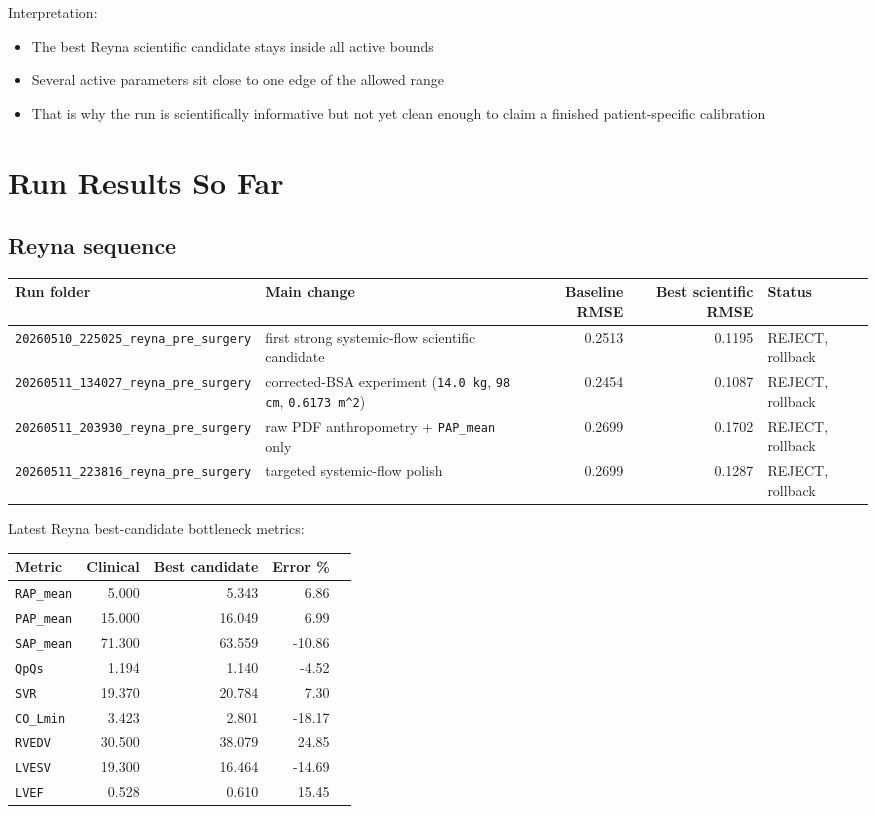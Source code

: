 \documentclass[11pt,a4paper]{article}
\begin{document}
Interpretation:

\begin{itemize}[leftmargin=1.5em]
    \item The best Reyna scientific candidate stays inside all active bounds
    \item Several active parameters sit close to one edge of the allowed range
    \item That is why the run is scientifically informative but not yet clean
    enough to claim a finished patient-specific calibration
\end{itemize}

\section{Run Results So Far}

\subsection{Reyna sequence}

\begin{longtable}{p{4.0cm}p{4.7cm}rrp{3.1cm}}
\toprule
Run folder & Main change & Baseline RMSE & Best scientific RMSE & Status \\
\midrule
\endhead
\texttt{20260510\_225025\_reyna\_pre\_surgery} & first strong systemic-flow scientific candidate & 0.2513 & 0.1195 & REJECT, rollback \\
\texttt{20260511\_134027\_reyna\_pre\_surgery} & corrected-BSA experiment (\texttt{14.0 kg}, \texttt{98 cm}, \texttt{0.6173 m\^{}2}) & 0.2454 & 0.1087 & REJECT, rollback \\
\texttt{20260511\_203930\_reyna\_pre\_surgery} & raw PDF anthropometry + \texttt{PAP\_mean} only & 0.2699 & 0.1702 & REJECT, rollback \\
\texttt{20260511\_223816\_reyna\_pre\_surgery} & targeted systemic-flow polish & 0.2699 & 0.1287 & REJECT, rollback \\
\bottomrule
\end{longtable}

Latest Reyna best-candidate bottleneck metrics:

\begin{tabularx}{\textwidth}{lrrrr}
\toprule
Metric & Clinical & Best candidate & Error \% \\
\midrule
\texttt{RAP\_mean} & 5.000 & 5.343 & 6.86 \\
\texttt{PAP\_mean} & 15.000 & 16.049 & 6.99 \\
\texttt{SAP\_mean} & 71.300 & 63.559 & -10.86 \\
\texttt{QpQs} & 1.194 & 1.140 & -4.52 \\
\texttt{SVR} & 19.370 & 20.784 & 7.30 \\
\texttt{CO\_Lmin} & 3.423 & 2.801 & -18.17 \\
\texttt{RVEDV} & 30.500 & 38.079 & 24.85 \\
\texttt{LVESV} & 19.300 & 16.464 & -14.69 \\
\texttt{LVEF} & 0.528 & 0.610 & 15.45 \\
\bottomrule
\end{tabularx}
\end{document}
